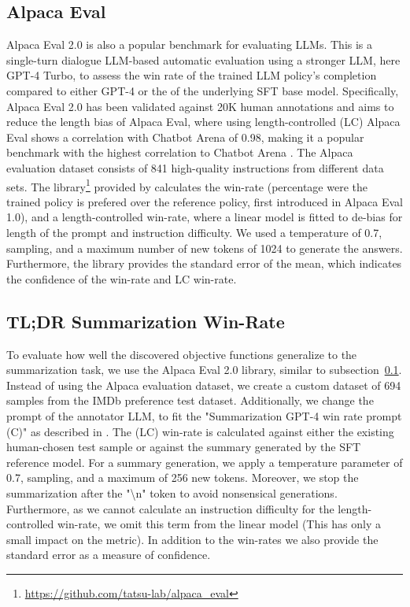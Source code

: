 \documentclass{article}
\theoremstyle{plain}
\theoremstyle{definition}
\theoremstyle{remark}
\begin{document}
\subsection{Alpaca Eval}
\label{alpaca-eval-explained}
Alpaca Eval 2.0 \citep{alpaca_eval, dubois2023alpacafarm, dubois2024length} is also a popular benchmark for evaluating LLMs. This is a single-turn dialogue LLM-based automatic evaluation using a stronger LLM, here GPT-4 Turbo, to assess the win rate of the trained LLM policy's completion compared to either GPT-4 or the of the underlying SFT base model. Specifically, Alpaca Eval 2.0 has been validated against 20K human annotations and aims to reduce the length bias of Alpaca Eval, where using length-controlled (LC) Alpaca Eval shows a correlation with Chatbot Arena of 0.98, making it a popular benchmark with the highest correlation to Chatbot Arena \citep{dubois2024length}. The Alpaca evaluation dataset consists of 841 high-quality instructions from different data sets. The library\footnote{\href{https://github.com/tatsu-lab/alpaca_eval}{https://github.com/tatsu-lab/alpaca\_eval}} provided by \citet{dubois2024length} calculates the win-rate (percentage were the trained policy is prefered over the reference policy, first introduced in Alpaca Eval 1.0), and a length-controlled win-rate, where a linear model is fitted to de-bias for length of the prompt and instruction difficulty. We used a temperature of 0.7, sampling, and a maximum number of new tokens of 1024 to generate the answers. Furthermore, the library provides the standard error of the mean, which indicates the confidence of the win-rate and LC win-rate.

\subsection{TL;DR Summarization Win-Rate}
\label{tldr-eval}
To evaluate how well the discovered objective functions generalize to the summarization task, we use the Alpaca Eval 2.0 library, similar to subsection~\ref{alpaca-eval-explained}. Instead of using the Alpaca evaluation dataset, we create a custom dataset of 694 samples from the IMDb preference test dataset. Additionally, we change the prompt of the annotator LLM, to fit the "Summarization GPT-4 win rate prompt (C)" as described in \citet{rafailov2023direct}. The (LC) win-rate is calculated against either the existing human-chosen test sample or against the summary generated by the SFT reference model. For a summary generation, we apply a temperature parameter of 0.7, sampling, and a maximum of 256 new tokens. Moreover, we stop the summarization after the "\textbackslash n" token to avoid nonsensical generations. Furthermore, as we cannot calculate an instruction difficulty for the length-controlled win-rate, we omit this term from the linear model (This has only a small impact on the metric). In addition to the win-rates we also provide the standard error as a measure of confidence.
\end{document}
